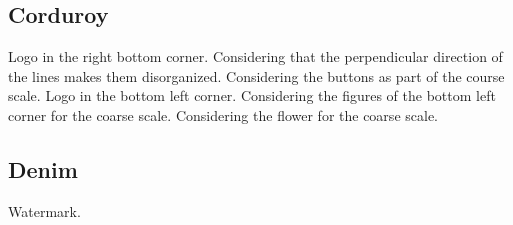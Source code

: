 \clearpage
\renewcommand{\matName}{Corduroy}
\subsection{\matName}

\renewcommand{\imgNumber}{01}
{Logo in the right bottom corner.}{}
\renewcommand{\imgNumber}{02}
{}{Considering that the perpendicular direction of the lines makes them disorganized.}
\renewcommand{\imgNumber}{03}
{}{}
\renewcommand{\imgNumber}{04}
{}{}
\renewcommand{\imgNumber}{05}
{}{}
\renewcommand{\imgNumber}{06}
{}{Considering the buttons as part of the course scale.}
\renewcommand{\imgNumber}{07}
{}{}
\renewcommand{\imgNumber}{08}
{Logo in the bottom left corner.}{}
\renewcommand{\imgNumber}{09}
{}{}
\renewcommand{\imgNumber}{10}
{}{Considering the figures of the bottom left corner for the coarse scale.}
\renewcommand{\imgNumber}{11}
{}{}
\renewcommand{\imgNumber}{12}
{}{Considering the flower for the coarse scale.}

\clearpage
\renewcommand{\matName}{Denim}
\subsection{\matName}

\renewcommand{\imgNumber}{01}
{}{}
\renewcommand{\imgNumber}{02}
{}{}
\renewcommand{\imgNumber}{03}
{}{}
\renewcommand{\imgNumber}{04}
{}{}
\renewcommand{\imgNumber}{05}
{}{}
\renewcommand{\imgNumber}{06}
{}{}
\renewcommand{\imgNumber}{07}
{}{}
\renewcommand{\imgNumber}{08}
{Watermark.}{}
\renewcommand{\imgNumber}{09}
{}{}
\renewcommand{\imgNumber}{10}
{}{}
\renewcommand{\imgNumber}{11}
{}{}
\renewcommand{\imgNumber}{12}
{}{}

